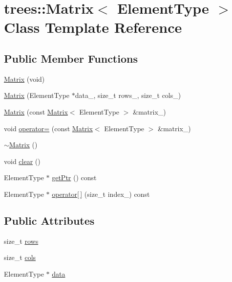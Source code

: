 \hypertarget{classtrees_1_1_matrix}{}\section{trees\+:\+:Matrix$<$ Element\+Type $>$ Class Template Reference}
\label{classtrees_1_1_matrix}
\subsection*{Public Member Functions}
\begin{DoxyCompactItemize}
\item 
\hyperlink{classtrees_1_1_matrix_a363bff5b1ded7ead42eeb72cfee359f3}{Matrix} (void)
\item 
\hyperlink{classtrees_1_1_matrix_a476f805286aeea991d815402c2ff703a}{Matrix} (Element\+Type $\ast$data\+\_\+, size\+\_\+t rows\+\_\+, size\+\_\+t cols\+\_\+)
\item 
\hyperlink{classtrees_1_1_matrix_aaa1772283d722e34a9a914f1d493a754}{Matrix} (const \hyperlink{classtrees_1_1_matrix}{Matrix}$<$ Element\+Type $>$ \&matrix\+\_\+)
\item 
void \hyperlink{classtrees_1_1_matrix_a1467c63bceec8a38771c845fad759784}{operator=} (const \hyperlink{classtrees_1_1_matrix}{Matrix}$<$ Element\+Type $>$ \&matrix\+\_\+)
\item 
\hyperlink{classtrees_1_1_matrix_a4eac26e6570ad219af70aa36eeadc2f7}{$\sim$\+Matrix} ()
\item 
void \hyperlink{classtrees_1_1_matrix_a6911e51830c70251a2655c080f4ad04e}{clear} ()
\item 
Element\+Type $\ast$ \hyperlink{classtrees_1_1_matrix_ae4c759a614daf9f1f019566eca92edab}{get\+Ptr} () const
\item 
Element\+Type $\ast$ \hyperlink{classtrees_1_1_matrix_a8ef252012ddf2ca4ebfd096ff0a1122b}{operator\mbox{[}$\,$\mbox{]}} (size\+\_\+t index\+\_\+) const
\end{DoxyCompactItemize}
\subsection*{Public Attributes}
\begin{DoxyCompactItemize}
\item 
size\+\_\+t \hyperlink{classtrees_1_1_matrix_a88dfff3f217f59caec11e519b23153f6}{rows}
\item 
size\+\_\+t \hyperlink{classtrees_1_1_matrix_a612011a0ae81b3e9d0a7e44a7e827f5c}{cols}
\item 
Element\+Type $\ast$ \hyperlink{classtrees_1_1_matrix_ac7cf0dc5123d2df5cfbac43c5b3c3ee6}{data}
\end{DoxyCompactItemize}


